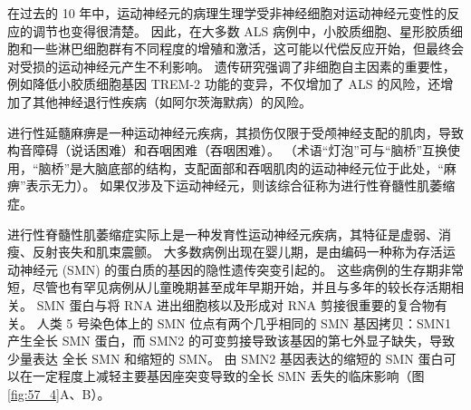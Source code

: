 在过去的 10 年中，运动神经元的病理生理学受非神经细胞对运动神经元变性的反应的调节也变得很清楚。
因此，在大多数 ALS 病例中，小胶质细胞、星形胶质细胞和一些淋巴细胞群有不同程度的增殖和激活，这可能以代偿反应开始，但最终会对受损的运动神经元产生不利影响。
遗传研究强调了非细胞自主因素的重要性，例如降低小胶质细胞基因 TREM-2 功能的变异，不仅增加了 ALS 的风险，还增加了其他神经退行性疾病（如阿尔茨海默病）的风险。


进行性延髓麻痹是一种运动神经元疾病，其损伤仅限于受颅神经支配的肌肉，导致构音障碍（说话困难）和吞咽困难（吞咽困难）。 
（术语“灯泡”可与“脑桥”互换使用，“脑桥”是大脑底部的结构，支配面部和吞咽肌肉的运动神经元位于此处，“麻痹”表示无力）。
如果仅涉及下运动神经元，则该综合征称为进行性脊髓性肌萎缩症。


进行性脊髓性肌萎缩症实际上是一种发育性运动神经元疾病，其特征是虚弱、消瘦、反射丧失和肌束震颤。
大多数病例出现在婴儿期，是由编码一种称为存活运动神经元 (SMN) 的蛋白质的基因的隐性遗传突变引起的。
这些病例的生存期非常短，尽管也有罕见病例从儿童晚期甚至成年早期开始，并且与多年的较长存活期相关。
SMN 蛋白与将 RNA 进出细胞核以及形成对 RNA 剪接很重要的复合物有关。
人类 5 号染色体上的 SMN 位点有两个几乎相同的 SMN 基因拷贝：SMN1 产生全长 SMN 蛋白，而 SMN2 的可变剪接导致该基因的第七外显子缺失，导致少量表达 全长 SMN 和缩短的 SMN。
由 SMN2 基因表达的缩短的 SMN 蛋白可以在一定程度上减轻主要基因座突变导致的全长 SMN 丢失的临床影响（图 \ref{fig:57_4}A、B）。


